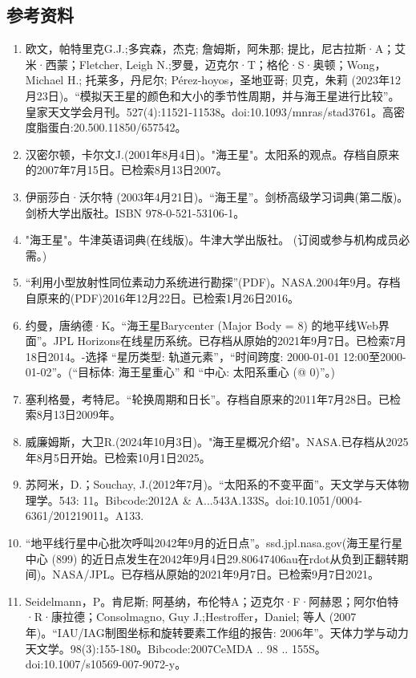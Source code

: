 \subsection{参考资料}
\begin{enumerate}
\item 欧文，帕特里克G.J.;多宾森，杰克; 詹姆斯，阿朱那; 提比，尼古拉斯·A；艾米·西蒙；Fletcher, Leigh N.;罗曼，迈克尔·T；格伦·S·奥顿；Wong，Michael H.; 托莱多，丹尼尔; Pérez-hoyos，圣地亚哥; 贝克，朱莉 (2023年12月23日)。“模拟天王星的颜色和大小的季节性周期，并与海王星进行比较”。皇家天文学会月刊。527(4):11521-11538。doi:10.1093/mnras/stad3761。高密度脂蛋白:20.500.11850/657542。
\item 汉密尔顿，卡尔文J.(2001年8月4日)。"海王星"。太阳系的观点。存档自原来的2007年7月15日。已检索8月13日2007。
\item 伊丽莎白·沃尔特 (2003年4月21日)。“海王星”。剑桥高级学习词典(第二版)。剑桥大学出版社。ISBN  978-0-521-53106-1。
\item "海王星"。牛津英语词典(在线版)。牛津大学出版社。 (订阅或参与机构成员必需。)
\item “利用小型放射性同位素动力系统进行勘探”(PDF)。NASA.2004年9月。存档自原来的(PDF)2016年12月22日。已检索1月26日2016。
\item 约曼，唐纳德·K。“海王星Barycenter (Major Body = 8) 的地平线Web界面”。JPL Horizons在线星历系统。已存档从原始的2021年9月7日。已检索7月18日2014。-选择 “星历类型: 轨道元素”，“时间跨度: 2000-01-01 12:00至2000-01-02”。(“目标体: 海王星重心” 和 “中心: 太阳系重心 (@ 0)”。)
\item 塞利格曼，考特尼。“轮换周期和日长”。存档自原来的2011年7月28日。已检索8月13日2009年。
\item 威廉姆斯，大卫R.(2024年10月3日)。"海王星概况介绍"。NASA.已存档从2025年8月5日开始。已检索10月1日2025。
\item 苏阿米，D.；Souchay, J.(2012年7月)。“太阳系的不变平面”。天文学与天体物理学。543: 11。Bibcode:2012A & A...543A.133S。doi:10.1051/0004-6361/201219011。A133.
\item “地平线行星中心批次呼叫2042年9月的近日点”。ssd.jpl.nasa.gov(海王星行星中心 (899) 的近日点发生在2042年9月4日29.80647406au在rdot从负到正翻转期间)。NASA/JPL。已存档从原始的2021年9月7日。已检索9月7日2021。
\item Seidelmann，P。肯尼斯; 阿基纳，布伦特A；迈克尔·F·阿赫恩；阿尔伯特·R·康拉德；Consolmagno, Guy J.;Hestroffer，Daniel; 等人 (2007年)。“IAU/IAG制图坐标和旋转要素工作组的报告: 2006年”。天体力学与动力天文学。98(3):155-180。Bibcode:2007CeMDA .. 98 .. 155S。doi:10.1007/s10569-007-9072-y。

\end{enumerate}
